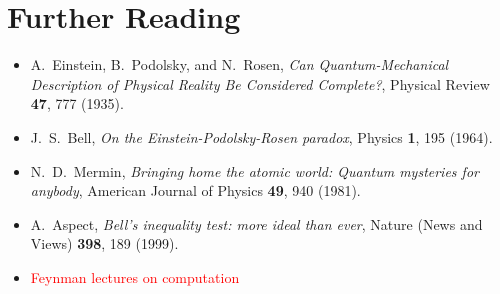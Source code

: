 \documentclass[pra,11pt]{revtex4}
\begin{document}
\section*{Further Reading}

\begin{itemize}
\item A.~Einstein, B.~Podolsky, and N.~Rosen,
  \textit{Can Quantum-Mechanical Description of Physical Reality Be
    Considered Complete?}, Physical Review \textbf{47}, 777 (1935).
  \label{cite:epr}

\item J.~S.~Bell, \textit{On the Einstein-Podolsky-Rosen paradox},
  Physics \textbf{1}, 195 (1964). \label{cite:bell}
  
\item N.~D.~Mermin, \textit{Bringing home the atomic world: Quantum
  mysteries for anybody}, American Journal of Physics \textbf{49}, 940
  (1981). \label{cite:mermin}

\item A.~Aspect, \textit{Bell's inequality test: more ideal than ever},
  Nature (News and Views) \textbf{398}, 189 (1999). \label{cite:aspect}

\item \textcolor{red}{Feynman lectures on computation}
  \label{cite:feynman}
\end{itemize}
\end{document}
